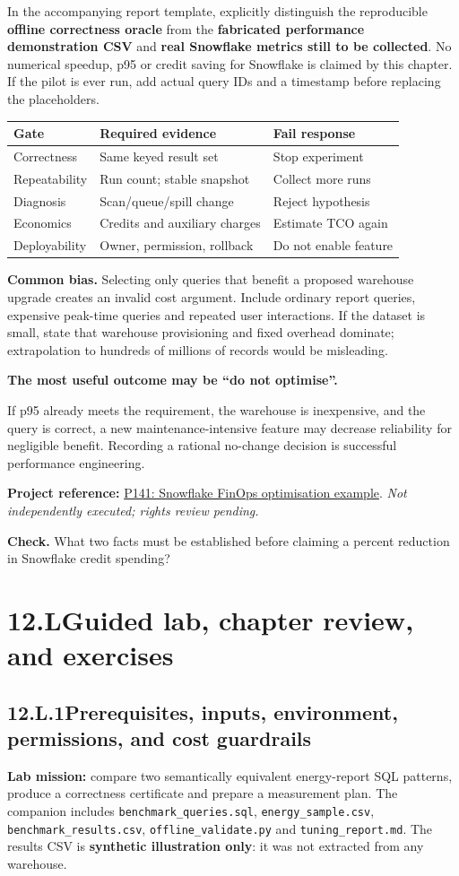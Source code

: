 \documentclass[11pt,twoside]{article}
\newcommand{\topic}[2]{\subsection*{#1\quad #2}}
\newcommand{\repo}[2]{\par\begingroup\fontsize{8.0}{9.6}\selectfont\sffamily\color{inkgray}\textbf{Project reference:} \href{#2}{#1}. \textit{Not independently executed; rights review pending.}\par\endgroup}
\begin{document}
In the accompanying report template, explicitly distinguish the reproducible \textbf{offline correctness oracle} from the \textbf{fabricated performance demonstration CSV} and \textbf{real Snowflake metrics still to be collected}. No numerical speedup, p95 or credit saving for Snowflake is claimed by this chapter. If the pilot is ever run, add actual query IDs and a timestamp before replacing the placeholders.
\begin{center}\renewcommand{\arraystretch}{1.13}\begin{tabularx}{\linewidth}{@{}p{31mm}XX@{}}\toprule
\textbf{Gate}&\textbf{Required evidence}&\textbf{Fail response}\\\midrule
Correctness&Same keyed result set&Stop experiment\\
Repeatability&Run count; stable snapshot&Collect more runs\\
Diagnosis&Scan/queue/spill change&Reject hypothesis\\
Economics&Credits and auxiliary charges&Estimate TCO again\\
Deployability&Owner, permission, rollback&Do not enable feature\\\bottomrule\end{tabularx}\end{center}
\textbf{Common bias.} Selecting only queries that benefit a proposed warehouse upgrade creates an invalid cost argument. Include ordinary report queries, expensive peak-time queries and repeated user interactions. If the dataset is small, state that warehouse provisioning and fixed overhead dominate; extrapolation to hundreds of millions of records would be misleading.
\begin{insight}\textbf{The most useful outcome may be ``do not optimise''.}\par
If p95 already meets the requirement, the warehouse is inexpensive, and the query is correct, a new maintenance-intensive feature may decrease reliability for negligible benefit. Recording a rational no-change decision is successful performance engineering.\end{insight}
\repo{P141: Snowflake FinOps optimisation example}{https://github.com/Bravarthan/snowflake-finops-optimization}
\textbf{Check.} What two facts must be established before claiming a percent reduction in Snowflake credit spending?
\newpage
\section*{12.L\quad Guided lab, chapter review, and exercises}
\topic{12.L.1}{Prerequisites, inputs, environment, permissions, and cost guardrails}
\textbf{Lab mission:} compare two semantically equivalent energy-report SQL patterns, produce a correctness certificate and prepare a measurement plan. The companion includes \texttt{benchmark\_queries.sql}, \texttt{energy\_sample.csv}, \texttt{benchmark\_results.csv}, \texttt{offline\_validate.py} and \texttt{tuning\_report.md}. The results CSV is \textbf{synthetic illustration only}: it was not extracted from any warehouse.
\end{document}
